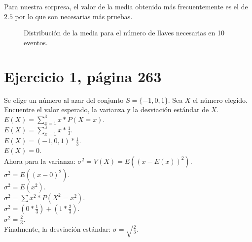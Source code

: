\documentclass[]{article}
\begin{document}
 Para nuestra sorpresa, el valor de la media obtenido más frecuentemente es el de $2.5$ por lo que son necesarias más pruebas.
 \begin{figure}[hbt!]
\centering
{}%
\hfill
{}%
\hfill


\caption{Distribución de la media para el número de llaves necesarias en 10 eventos.}

\label{fig:casos2}
\end{figure}
     
\section{Ejercicio 1, página 263}
Se elige un número al azar del conjunto $ S = \{- 1, 0, 1\} $. Sea $ X $ el número elegido. Encuentre el valor esperado, la varianza y la desviación estándar de $ X $.\\
$E(X) = \sum_{x = 1}^{3} x * P(X = x)$.\\
$E(X) = \sum_{x = 1}^{3} x * \frac{1}{3}$.\\
$E(X) = (-1, 0, 1)* \frac{1}{3}$.\\
$E(X) = 0$.\\
Ahora para la varianza:
$\sigma^{2} = V(X) = E((x-E(x))^{2})$.\\
$\sigma^{2} = E((x-0)^{2})$.\\
$\sigma^{2} = E(x^{2})$.\\
$\sigma^{2} = \sum x^{2} * P(X^{2} = x^{2})$.\\
$\sigma^{2}  = (0 * \frac{1}{3}) + (1 * \frac{2}{3})$.\\
$\sigma^{2}  = \frac{2}{3}$.\\
Finalmente, la desviación estándar:
$\sigma = \sqrt{\frac{2}{3}}$.\\
\end{document}
